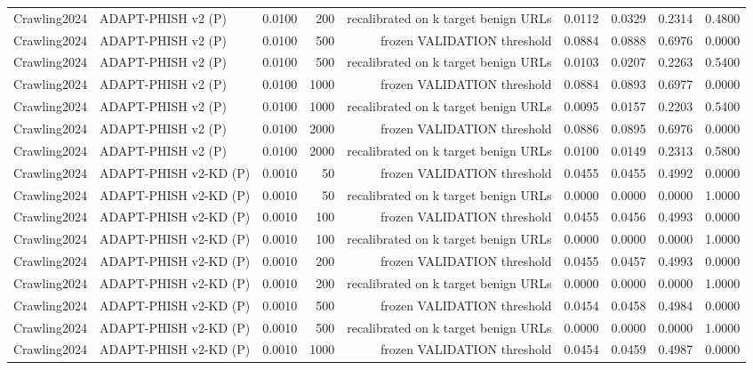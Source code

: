 \begin{table}[t]
\begin{tabular}{llrrrrrrr}
Crawling2024 & ADAPT-PHISH v2 (P) & 0.0100 & 200 & recalibrated on k target benign URLs & 0.0112 & 0.0329 & 0.2314 & 0.4800 \\
Crawling2024 & ADAPT-PHISH v2 (P) & 0.0100 & 500 & frozen VALIDATION threshold & 0.0884 & 0.0888 & 0.6976 & 0.0000 \\
Crawling2024 & ADAPT-PHISH v2 (P) & 0.0100 & 500 & recalibrated on k target benign URLs & 0.0103 & 0.0207 & 0.2263 & 0.5400 \\
Crawling2024 & ADAPT-PHISH v2 (P) & 0.0100 & 1000 & frozen VALIDATION threshold & 0.0884 & 0.0893 & 0.6977 & 0.0000 \\
Crawling2024 & ADAPT-PHISH v2 (P) & 0.0100 & 1000 & recalibrated on k target benign URLs & 0.0095 & 0.0157 & 0.2203 & 0.5400 \\
Crawling2024 & ADAPT-PHISH v2 (P) & 0.0100 & 2000 & frozen VALIDATION threshold & 0.0886 & 0.0895 & 0.6976 & 0.0000 \\
Crawling2024 & ADAPT-PHISH v2 (P) & 0.0100 & 2000 & recalibrated on k target benign URLs & 0.0100 & 0.0149 & 0.2313 & 0.5800 \\
Crawling2024 & ADAPT-PHISH v2-KD (P) & 0.0010 & 50 & frozen VALIDATION threshold & 0.0455 & 0.0455 & 0.4992 & 0.0000 \\
Crawling2024 & ADAPT-PHISH v2-KD (P) & 0.0010 & 50 & recalibrated on k target benign URLs & 0.0000 & 0.0000 & 0.0000 & 1.0000 \\
Crawling2024 & ADAPT-PHISH v2-KD (P) & 0.0010 & 100 & frozen VALIDATION threshold & 0.0455 & 0.0456 & 0.4993 & 0.0000 \\
Crawling2024 & ADAPT-PHISH v2-KD (P) & 0.0010 & 100 & recalibrated on k target benign URLs & 0.0000 & 0.0000 & 0.0000 & 1.0000 \\
Crawling2024 & ADAPT-PHISH v2-KD (P) & 0.0010 & 200 & frozen VALIDATION threshold & 0.0455 & 0.0457 & 0.4993 & 0.0000 \\
Crawling2024 & ADAPT-PHISH v2-KD (P) & 0.0010 & 200 & recalibrated on k target benign URLs & 0.0000 & 0.0000 & 0.0000 & 1.0000 \\
Crawling2024 & ADAPT-PHISH v2-KD (P) & 0.0010 & 500 & frozen VALIDATION threshold & 0.0454 & 0.0458 & 0.4984 & 0.0000 \\
Crawling2024 & ADAPT-PHISH v2-KD (P) & 0.0010 & 500 & recalibrated on k target benign URLs & 0.0000 & 0.0000 & 0.0000 & 1.0000 \\
Crawling2024 & ADAPT-PHISH v2-KD (P) & 0.0010 & 1000 & frozen VALIDATION threshold & 0.0454 & 0.0459 & 0.4987 & 0.0000 \\

\end{tabular}
\end{table}
